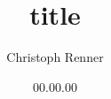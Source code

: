 \documentclass[a4paper,12pt,twoside,DIV=15,BCOR=20mm,headsepline,titlepage=true,openright,final,english]{scrbook}
\title{title}%
\author{Christoph Renner}
\date{00.00.00}
\begin{document}



  
\mainmatter


\tableofcontents
\linenumbers

\renewcommand{\arraystretch}{1.2}  




 




\backmatter

%
 
\end{document}
